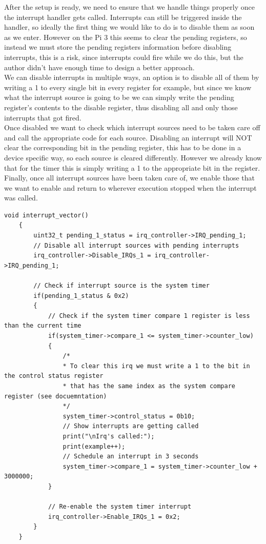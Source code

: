 \documentclass[12pt, svgnames]{book}
\begin{document}
After the setup is ready, we need to ensure that we handle things properly once the interrupt handler gets called. Interrupts can still be triggered inside the handler, so ideally the first thing we would like to do is to disable them as soon as we enter. However on the Pi 3 this seems to clear the pending registers, so instead we must store the pending registers information before disabling interrupts, this is a risk, since interrupts could fire while we do this, but the author didn't have enough time to design a better approach. 
\\
We can disable interrupts in multiple ways, an option is to disable all of them by writing a 1 to every single bit in every register for example, but since we know what the interrupt source is going to be we can simply write the pending register's contents to the disable register, thus disabling all and only those interrupts that got fired.
\\
Once disabled we want to check which interrupt sources need to be taken care off and call the appropriate code for each source. Disabling an interrupt will NOT clear the corresponding bit in the pending register, this has to be done in a device specific way, so each source is cleared differently. However we already know that for the timer this is simply writing a 1 to the appropriate bit in the  register.
\\
Finally, once all interrupt sources have been taken care of, we enable those that we want to enable and return to wherever execution stopped when the interrupt was called. 

\newpage
\begin{lstlisting}[style=C, title=IRQ Handler example]
	void interrupt_vector()
	{
		uint32_t pending_1_status = irq_controller->IRQ_pending_1;
		// Disable all interrupt sources with pending interrupts
		irq_controller->Disable_IRQs_1 = irq_controller->IRQ_pending_1;
		
		// Check if interrupt source is the system timer
		if(pending_1_status & 0x2)
		{
			// Check if the system timer compare 1 register is less than the current time
			if(system_timer->compare_1 <= system_timer->counter_low)
			{
				/*
				* To clear this irq we must write a 1 to the bit in the control status register
				* that has the same index as the system compare register (see docuemntation)
				*/
				system_timer->control_status = 0b10;
				// Show interrupts are getting called
				print("\nIrq's called:"); 
				print(example++);
				// Schedule an interrupt in 3 seconds
				system_timer->compare_1 = system_timer->counter_low + 3000000;
			}
			
			// Re-enable the system timer interrupt
			irq_controller->Enable_IRQs_1 = 0x2;
		}
	}
\end{lstlisting}
\end{document}
